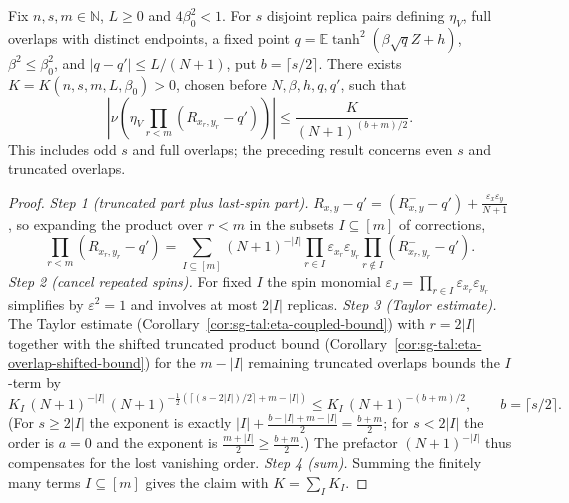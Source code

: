 \begin{corollary}\label{cor:sg-tal:eta-full-overlap-shifted-bound}
\leanok
{}
Fix $n,s,m\in\mathbb N$, $L\ge0$ and $4\beta_0^2<1$. For $s$ disjoint replica
pairs defining $\eta_V$, full overlaps with distinct endpoints, a fixed point
$q=\mathbb E\tanh^2(\beta\sqrt q Z+h)$, $\beta^2\le\beta_0^2$, and
$|q-q'|\le L/(N+1)$, put $b=\lceil s/2\rceil$. There exists
$K=K(n,s,m,L,\beta_0)>0$, chosen before $N,\beta,h,q,q'$, such that
\[
\left|\nu\left(\eta_V\prod_{r<m}(R_{x_r,y_r}-q')\right)\right|
\le \frac{K}{(N+1)^{(b+m)/2}}.
\]
This includes odd $s$ and full overlaps; the preceding result concerns even $s$ and truncated overlaps.
\end{corollary}
\begin{proof}
\leanok
\emph{Step 1 (truncated part plus last-spin part).} $R_{x,y}-q'=(R^-_{x,y}-q')+\frac{\varepsilon_x\varepsilon_y}{N+1}$, so expanding the product over $r<m$ in the subsets $I\subseteq[m]$ of corrections,
\[
\prod_{r<m}(R_{x_r,y_r}-q')=\sum_{I\subseteq[m]}(N+1)^{-|I|}\prod_{r\in I}\varepsilon_{x_r}\varepsilon_{y_r}\prod_{r\notin I}(R^-_{x_r,y_r}-q') .
\]
\emph{Step 2 (cancel repeated spins).} For fixed $I$ the spin monomial $\varepsilon_J=\prod_{r\in I}\varepsilon_{x_r}\varepsilon_{y_r}$ simplifies by $\varepsilon^2=1$ and involves at most $2|I|$ replicas.
\emph{Step 3 (Taylor estimate).} The Taylor estimate (Corollary~\ref{cor:sg-tal:eta-coupled-bound}) with $r=2|I|$ together with the shifted truncated product bound (Corollary~\ref{cor:sg-tal:eta-overlap-shifted-bound}) for the $m-|I|$ remaining truncated overlaps bounds the $I$-term by
\[
K_I\,(N+1)^{-|I|}\,(N+1)^{-\frac12\left(\lceil(s-2|I|)/2\rceil+m-|I|\right)}\le K_I\,(N+1)^{-(b+m)/2},\qquad b=\lceil s/2\rceil .
\]
(For $s\ge2|I|$ the exponent is exactly $|I|+\frac{b-|I|+m-|I|}2=\frac{b+m}2$; for $s<2|I|$ the order is $a=0$ and the exponent is $\frac{m+|I|}2\ge\frac{b+m}2$.) The prefactor $(N+1)^{-|I|}$ thus compensates for the lost vanishing order.
\emph{Step 4 (sum).} Summing the finitely many terms $I\subseteq[m]$ gives the claim with $K=\sum_IK_I$.
\end{proof}

